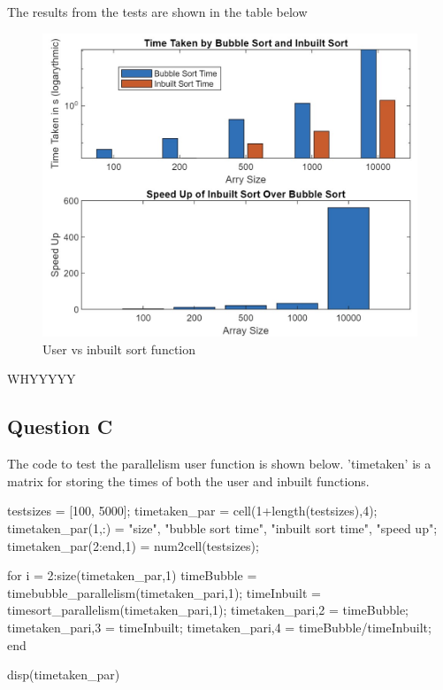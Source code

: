The results from the tests are shown in the table below


\begin{figure}[H]
 \centering
 \includegraphics[width=0.6\columnwidth]{Figures/noPar}
 \caption{User vs inbuilt sort function}
 \label{fig:noPar}
\end{figure}

WHYYYYY

\subsection{Question C}
The code to test the parallelism  user function is shown below.
'timetaken' is a matrix for storing the times of both the user and inbuilt functions.

\begin{Matlab}%
 testsizes = [100, 5000];
 timetaken_par = cell(1+length(testsizes),4);
 timetaken_par(1,:) = {"size", "bubble sort time", "inbuilt sort time", "speed up"};
 timetaken_par(2:end,1) = num2cell(testsizes); %

 for i = 2:size(timetaken_par,1)
  timeBubble = timebubble_parallelism(timetaken_par{i,1});
  timeInbuilt = timesort_parallelism(timetaken_par{i,1});
  timetaken_par{i,2} = timeBubble;
  timetaken_par{i,3} = timeInbuilt;
  timetaken_par{i,4} = timeBubble/timeInbuilt;
 end

 disp(timetaken_par)
\end{Matlab}

